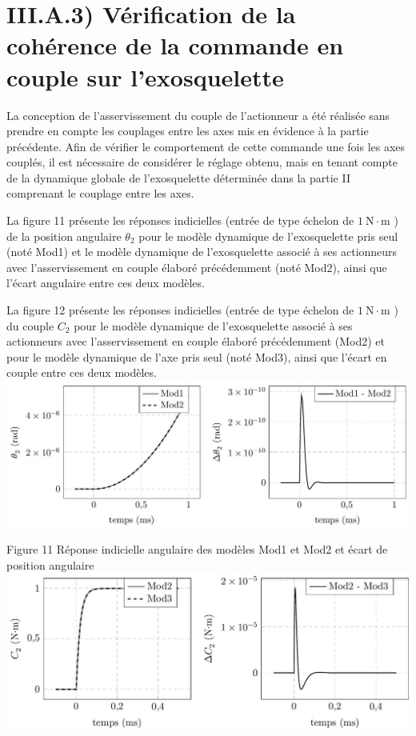 \documentclass[10pt]{article}
\begin{document}
\section{III.A.3) Vérification de la cohérence de la commande en couple sur l'exosquelette}
La conception de l'asservissement du couple de l'actionneur a été réalisée sans prendre en compte les couplages entre les axes mis en évidence à la partie précédente. Afin de vérifier le comportement de cette commande une fois les axes couplés, il est nécessaire de considérer le réglage obtenu, mais en tenant compte de la dynamique globale de l'exosquelette déterminée dans la partie II comprenant le couplage entre les axes.

La figure 11 présente les réponses indicielles (entrée de type échelon de $1 \mathrm{~N} \cdot \mathrm{m}$ ) de la position angulaire $\theta_{2}$ pour le modèle dynamique de l'exosquelette pris seul (noté Mod1) et le modèle dynamique de l'exosquelette associé à ses actionneurs avec l'asservissement en couple élaboré précédemment (noté Mod2), ainsi que l'écart angulaire entre ces deux modèles.

La figure 12 présente les réponses indicielles (entrée de type échelon de $1 \mathrm{~N} \cdot \mathrm{m}$ ) du couple $C_{2}$ pour le modèle dynamique de l'exosquelette associé à ses actionneurs avec l'asservissement en couple élaboré précédemment (Mod2) et pour le modèle dynamique de l'axe pris seul (noté Mod3), ainsi que l'écart en couple entre ces deux modèles.
\includegraphics[max width=\textwidth, center]{2023_05_12_54c6a64d2ffce28d5c72g-09}

Figure 11 Réponse indicielle angulaire des modèles Mod1 et Mod2 et écart de position angulaire
\includegraphics[max width=\textwidth, center]{2023_05_12_54c6a64d2ffce28d5c72g-09(1)}
\end{document}
